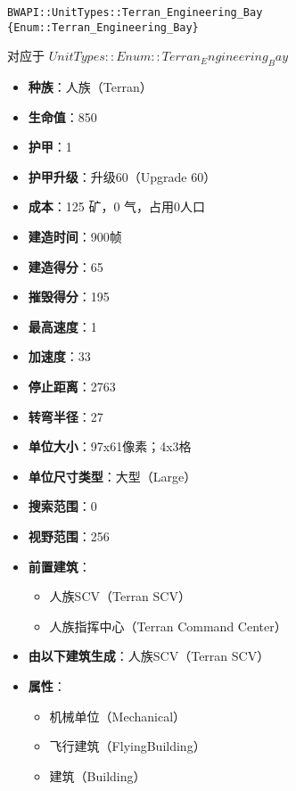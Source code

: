 \begin{tcolorbox}[colback=white, colframe=black!60!white, title=Terran\_Engineering\_Bay(), arc=0mm]
    \begin{verbatim}
BWAPI::UnitTypes::Terran_Engineering_Bay {Enum::Terran_Engineering_Bay}
    \end{verbatim}
    对应于  $ UnitTypes::Enum::Terran_Engineering_Bay $ 
    \begin{itemize}
        \item \textbf{种族}：人族（Terran）
        \item \textbf{生命值}：850
        \item \textbf{护甲}：1
        \item \textbf{护甲升级}：升级60（Upgrade 60）
        \item \textbf{成本}：125 矿，0 气，占用0人口
        \item \textbf{建造时间}：900帧
        \item \textbf{建造得分}：65
        \item \textbf{摧毁得分}：195
        \item \textbf{最高速度}：1
        \item \textbf{加速度}：33
        \item \textbf{停止距离}：2763
        \item \textbf{转弯半径}：27
        \item \textbf{单位大小}：97x61像素；4x3格
        \item \textbf{单位尺寸类型}：大型（Large）
        \item \textbf{搜索范围}：0
        \item \textbf{视野范围}：256
        \item \textbf{前置建筑}：
            \begin{itemize}
                \item 人族SCV（Terran SCV）
                \item 人族指挥中心（Terran Command Center）
            \end{itemize}
        \item \textbf{由以下建筑生成}：人族SCV（Terran SCV）
        \item \textbf{属性}：
            \begin{itemize}
                \item 机械单位（Mechanical）
                \item 飞行建筑（FlyingBuilding）
                \item 建筑（Building）
            \end{itemize}
    \end{itemize}
\end{tcolorbox}

